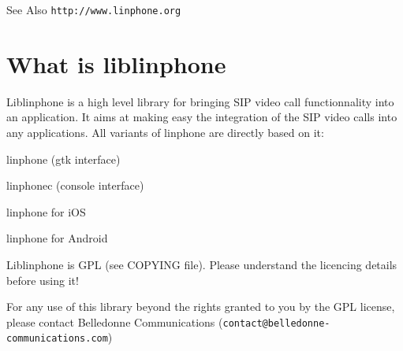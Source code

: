 \begin{DoxySeeAlso}{See Also}
{\tt http\-://www.\-linphone.\-org}
\end{DoxySeeAlso}
\section{What is liblinphone}\label{index_what_is_it}
Liblinphone is a high level library for bringing S\-I\-P video call functionnality into an application. It aims at making easy the integration of the S\-I\-P video calls into any applications. All variants of linphone are directly based on it\-:
\begin{DoxyItemize}
\item linphone (gtk interface)
\item linphonec (console interface)
\item linphone for i\-O\-S
\item linphone for Android
\end{DoxyItemize}

Liblinphone is G\-P\-L (see C\-O\-P\-Y\-I\-N\-G file). Please understand the licencing details before using it!

For any use of this library beyond the rights granted to you by the G\-P\-L license, please contact Belledonne Communications ({\tt contact@belledonne-\/communications.\-com}) 